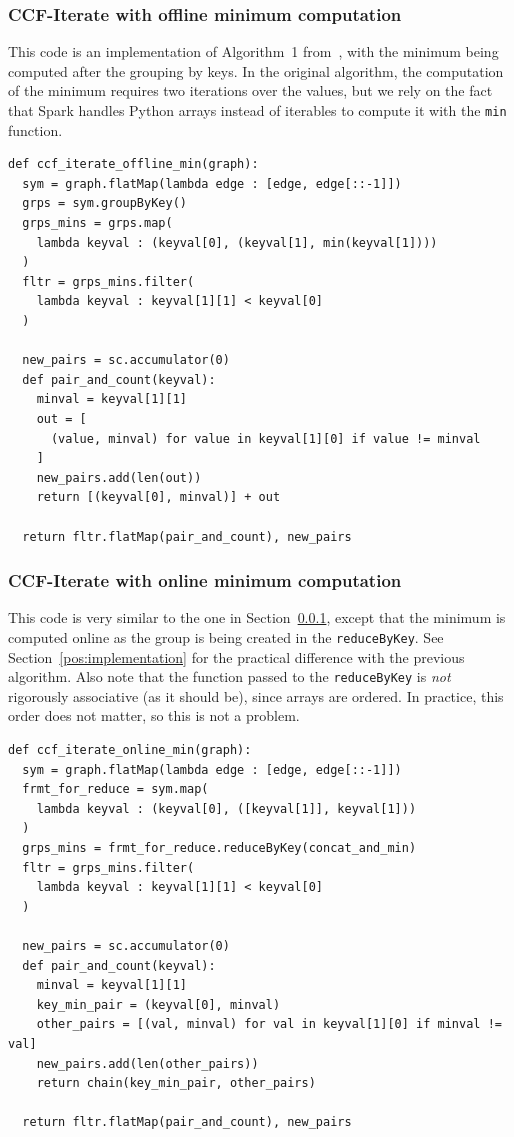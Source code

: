 \documentclass[a4paper,12pt]{article}
\begin{document}
\subsubsection{CCF-Iterate with offline minimum computation}
\label{pos:offlinemin}
This code is an implementation of Algorithm~1 from~\cite{kardes2014ccf}, with the minimum being computed after the grouping by keys. In the original algorithm, the computation of the minimum requires two iterations over the values, but we rely on the fact that Spark handles Python arrays instead of iterables to compute it with the \verb|min| function.
\begin{verbatim}
def ccf_iterate_offline_min(graph):
  sym = graph.flatMap(lambda edge : [edge, edge[::-1]])
  grps = sym.groupByKey()
  grps_mins = grps.map(
    lambda keyval : (keyval[0], (keyval[1], min(keyval[1])))
  )
  fltr = grps_mins.filter(
    lambda keyval : keyval[1][1] < keyval[0]
  )
  
  new_pairs = sc.accumulator(0)
  def pair_and_count(keyval):
    minval = keyval[1][1]
    out = [
      (value, minval) for value in keyval[1][0] if value != minval
    ]
    new_pairs.add(len(out))
    return [(keyval[0], minval)] + out
  
  return fltr.flatMap(pair_and_count), new_pairs
\end{verbatim}

\subsubsection{CCF-Iterate with online minimum computation}
\label{pos:onlinemin}
This code is very similar to the one in Section~\ref{pos:offlinemin}, except that the minimum is computed online as the group is being created in the \verb|reduceByKey|. See Section~\ref{pos:implementation} for the practical difference with the previous algorithm. Also note that the function passed to the \verb|reduceByKey| is \emph{not} rigorously associative (as it should be), since arrays are ordered. In practice, this order does not matter, so this is not a problem.
\begin{verbatim}
def ccf_iterate_online_min(graph):
  sym = graph.flatMap(lambda edge : [edge, edge[::-1]])
  frmt_for_reduce = sym.map(
    lambda keyval : (keyval[0], ([keyval[1]], keyval[1]))
  )
  grps_mins = frmt_for_reduce.reduceByKey(concat_and_min)
  fltr = grps_mins.filter(
    lambda keyval : keyval[1][1] < keyval[0]
  )
  
  new_pairs = sc.accumulator(0)
  def pair_and_count(keyval):
    minval = keyval[1][1]
    key_min_pair = (keyval[0], minval)
    other_pairs = [(val, minval) for val in keyval[1][0] if minval != val]
    new_pairs.add(len(other_pairs))
    return chain(key_min_pair, other_pairs)
  
  return fltr.flatMap(pair_and_count), new_pairs
\end{verbatim}
\end{document}
